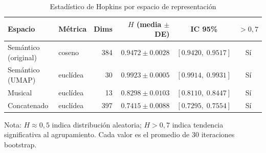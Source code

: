 \begin{table}[htbp]
  \centering
  \caption{Estadístico de Hopkins por espacio de representación}
  \label{tab:hopkins_results}
  \begin{tabular}{llrrcc}
    \toprule
    Espacio & Métrica & Dims & $H$ (media $\pm$ DE) & IC 95\% & $> 0{,}7$ \\
    \midrule
    Semántico (original) & coseno & 384 & $0.9472 \pm 0.0028$ & $[0.9420,\; 0.9517]$ & Sí \\
    Semántico (UMAP) & euclídea & 30 & $0.9923 \pm 0.0005$ & $[0.9914,\; 0.9931]$ & Sí \\
    Musical & euclídea & 13 & $0.8298 \pm 0.0103$ & $[0.8110,\; 0.8447]$ & Sí \\
    Concatenado & euclídea & 397 & $0.7415 \pm 0.0088$ & $[0.7295,\; 0.7554]$ & Sí \\
    \bottomrule
  \end{tabular}
  \begin{tablenotes}[flushleft]
    \small
    \item Nota: $H \approx 0{,}5$ indica distribución aleatoria; $H > 0{,}7$ indica tendencia significativa al agrupamiento. Cada valor es el promedio de 30 iteraciones bootstrap.
  \end{tablenotes}
\end{table}